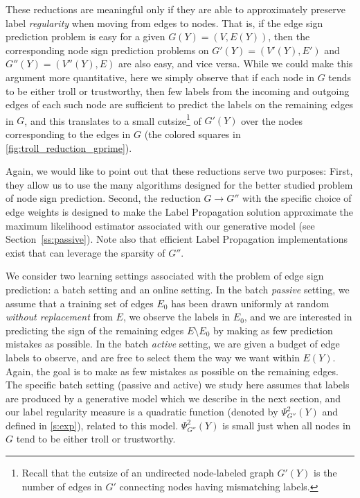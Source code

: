 These reductions are meaningful only if they are able to approximately preserve label
\emph{regularity} when moving from edges to nodes. That is, if the edge sign prediction problem is
easy for a given $G(Y) = (V,E(Y))$, then the corresponding node sign prediction problems on $G'(Y)
= (V'(Y),E')$ and $G''(Y) = (V''(Y),E)$ are also easy, and vice versa.  While we could make this
argument more quantitative, here we simply observe that if each node in $G$ tends to be either
troll or trustworthy, then few labels from the incoming and outgoing edges of each such node are
sufficient to predict the labels on the remaining edges in $G$, and this translates to a small
cutsize\footnote{Recall that the cutsize of an undirected node-labeled graph $G'(Y)$ is the number
of edges in $G'$ connecting nodes having mismatching labels.} of $G'(Y)$ over the nodes
corresponding to the edges in $G$ (the colored squares in \autoref{fig:troll_reduction_gprime}).

Again, we would like to point out that these reductions serve two purposes: First, they allow us to
use the many algorithms designed for the better studied problem of node sign prediction. Second,
the reduction $G\rightarrow G''$ with the specific choice of edge weights is designed to make the
Label Propagation solution approximate the maximum likelihood estimator associated with our
generative model (see Section~\ref{ss:passive}). Note also that efficient Label Propagation
implementations exist that can leverage the sparsity of $G''$.

We consider two learning settings associated with the problem of edge sign prediction: a batch
setting and an online setting. In the batch \emph{passive} setting, we assume that a training set
of edges $E_0$ has been drawn uniformly at random \emph{without replacement} from $E$, we observe
the labels in $E_0$, and we are interested in predicting the sign of the remaining edges $E
\setminus E_0$ by making as few prediction mistakes as possible. In the batch \emph{active}
setting, we are given a budget of edge labels to observe, and are free to select them the way we
want within $E(Y)$. Again, the goal is to make as few mistakes as possible on the remaining edges.
The specific batch setting (passive and active) we study here assumes that labels are produced by a
generative model which we describe in the next section, and our label regularity measure is a
quadratic function (denoted by $\Psi^2_{G''}(Y)$ and defined in \autoref{s:exp}), related to this
model. $\Psi^2_{G''}(Y)$ is small just when all nodes in $G$ tend to be either troll or
trustworthy. 

